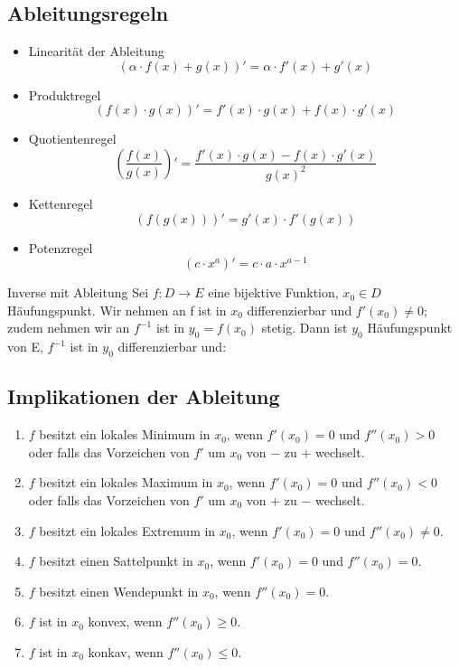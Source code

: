 \documentclass[a4paper,10pt]{article}
\begin{document}
\subsection{Ableitungsregeln}

\begin{itemize}
  \item Linearität der Ableitung
  $$(\alpha \cdot f(x) + g(x))' = \alpha \cdot f'(x) + g'(x)$$
  \item Produktregel
  $$(f(x) \cdot g(x))' = f'(x) \cdot g(x) + f(x) \cdot g'(x)$$
  \item Quotientenregel
  $$\left(\frac{f(x)}{g(x)}\right)' = \frac{f'(x) \cdot g(x) - f(x) \cdot g'(x)}{g(x)^2}$$
  \item Kettenregel
  $$(f(g(x)))' = g'(x) \cdot f'(g(x))$$
  \item Potenzregel
  $$(c \cdot x^a)' = c \cdot a \cdot x^{a - 1}$$
\end{itemize}

\begin{subbox}{Inverse mit Ableitung}
  Sei $f: D\to E$ eine bijektive Funktion, $x_0 \in D$ Häufungspunkt. Wir nehmen an f ist in $x_0$ differenzierbar und $f'(x_0) \neq 0$; zudem nehmen wir an $f^{-1}$ ist in $y_0 = f(x_0)$ stetig. Dann ist $y_0$ Häufungspunkt von E, $f^{-1}$ ist in $y_0$ differenzierbar und:\\ 
\end{subbox}

\subsection{Implikationen der Ableitung}
\begin{enumerate}
  \item $f$ besitzt ein lokales Minimum in $x_0$, wenn $f'(x_0) = 0$ und $f''(x_0) > 0$ oder falls das Vorzeichen von $f'$ um $x_0$ von $-$ zu $+$ wechselt.
  \item $f$ besitzt ein lokales Maximum in $x_0$, wenn $f'(x_0) = 0$ und $f''(x_0) < 0$ oder falls das Vorzeichen von $f'$ um $x_0$ von $+$ zu $-$ wechselt.
  \item $f$ besitzt ein lokales Extremum in $x_0$, wenn $f'(x_0) = 0$ und $f''(x_0) \ne 0$.
  \item $f$ besitzt einen Sattelpunkt in $x_0$, wenn $f'(x_0) = 0$ und $f''(x_0) = 0$.
  \item $f$ besitzt einen Wendepunkt in $x_0$, wenn $f''(x_0) = 0$.
  \item $f$ ist in $x_0$ konvex, wenn $f''(x_0) \ge 0$.
  \item $f$ ist in $x_0$ konkav, wenn $f''(x_0) \le 0$.
\end{enumerate}
\end{document}
